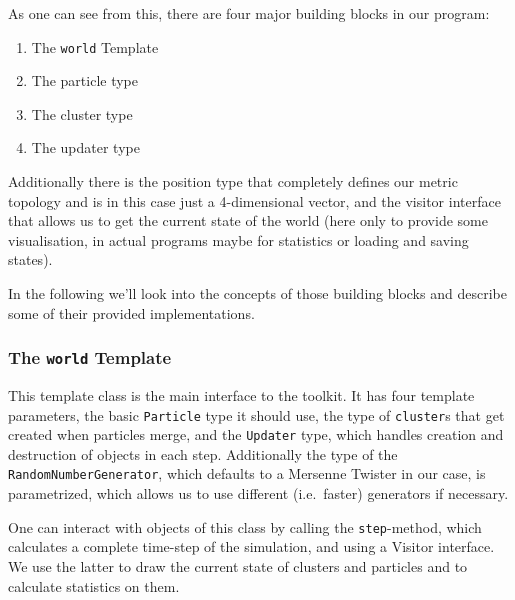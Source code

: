 \documentclass[twocolumn,10pt]{scrartcl}
\begin{document}
            As one can see from this, there are four major building blocks in our program:
            \begin{enumerate}
                \item The \lstinline'world' Template
                \item The particle type
                \item The cluster type
                \item The updater type
            \end{enumerate}
            Additionally there is the position type that completely defines our metric topology and is in this case just
            a 4-dimensional vector, and the visitor interface that allows us to get the current state of the world (here
            only to provide some visualisation, in actual programs maybe for statistics or loading and saving states).

            In the following we'll look into the concepts of those building blocks and describe some of their provided
            implementations.

            \subsubsection{The \lstinline!world! Template}
                This template class is the main interface to the toolkit. It has four template parameters, the basic
                \lstinline!Particle! type it should use, the type of \lstinline!cluster!s that get created when
                particles merge, and the \lstinline!Updater! type, which handles creation and destruction of objects in
                each step.  Additionally the type of the \lstinline!RandomNumberGenerator!, which defaults to a Mersenne
                Twister in our case, is parametrized, which allows us to use different (i.e.\ faster) generators if
                necessary.

                One can interact with objects of this class by calling the \lstinline!step!-method, which calculates a
                complete time-step of the simulation, and using a Visitor interface. We use the latter to draw the
                current state of clusters and particles and to calculate statistics on them.
\end{document}
